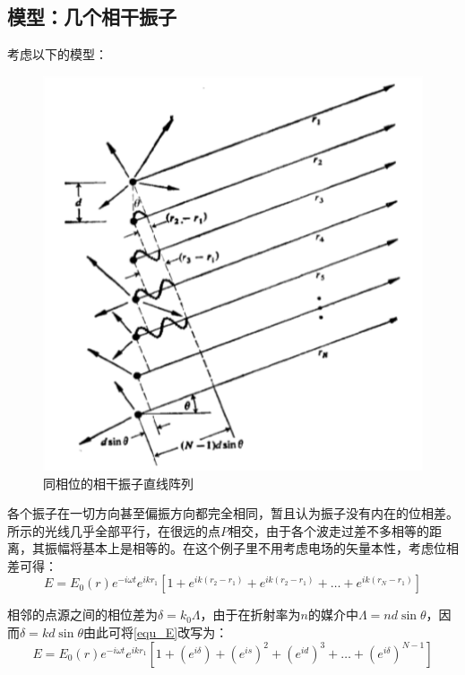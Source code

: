 \documentclass[UTF8]{ctexart}
\begin{document}
	\subsection{模型：几个相干振子}
	考虑以下的模型：
	\begin{figure}[ht]
		\centering	
		\includegraphics[width=14cm]{Diffraction_zhenzi.png}
		\caption{同相位的相干振子直线阵列}
		\label{figure_zhenzi}
	\end{figure}

	各个振子在一切方向甚至偏振方向都完全相同，暂且认为振子没有内在的位相差。所示的光线几乎全部平行，在很远的点$ P $相交，由于各个波走过差不多相等的距离，其振幅将基本上是相等的。在这个例子里不用考虑电场的矢量本性，考虑位相差可得：
	\begin{equation}
		E=E_{0}(r) e^{-i \omega t} e^{i k r_{1}}\left[1+e^{i k\left(r_{2}-r_{1}\right)}+e^{i k\left(r_{2}-r_{1}\right)}+\dots+e^{ik\left(r_{N}-r_{1}\right)}\right]\label{equ_E}
	\end{equation}
	
\noindent 相邻的点源之间的相位差为$ \delta=k_{0} \Lambda $，由于在折射率为$ n $的媒介中$ \Lambda =n d \sin \theta $，因而$ \delta= kd \sin \theta $由此可将\ref{equ_E}改写为：
\begin{equation}
	E=E_{0}(r) e^{-i \omega t} e^{i k r_{1}}\left[1+\left(e^{i \delta}\right)+\left(e^{i s}\right)^{2}+\left(e^{i d}\right)^{3}+\dots +\left(e^{i \delta}\right)^{N-1}\right]
\end{equation}
\end{document}

